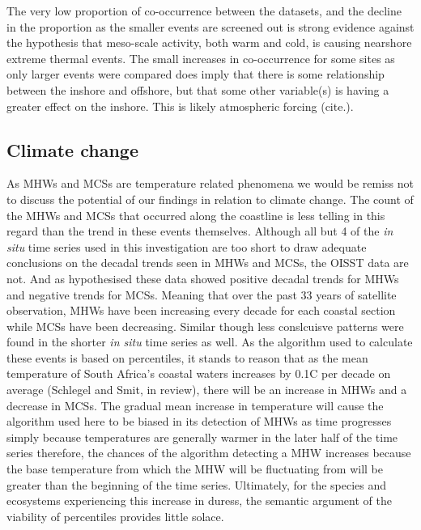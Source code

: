 \documentclass[a4paper,10pt,review]{elsarticle}
\begin{document}
The very low proportion of co-occurrence between the datasets, and the decline in the proportion as the smaller events are screened out is strong evidence against the hypothesis that meso-scale activity, both warm and cold, is causing nearshore extreme thermal events. The small increases in co-occurrence for some sites as only larger events were compared does imply that there is some relationship between the inshore and offshore, but that some other variable(s) is having a greater effect on the inshore. This is likely atmospheric forcing (cite.).

\subsection{Climate change}
As MHWs and MCSs are temperature related phenomena we would be remiss not to discuss the potential of our findings in relation to climate change. The count of the MHWs and MCSs that occurred along the coastline is less telling in this regard than the trend in these events themselves. Although all but 4 of the \emph{in situ} time series used in this investigation are too short to draw adequate conclusions on the decadal trends seen in MHWs and MCSs, the OISST data are not. And as hypothesised these data showed positive decadal trends for MHWs and negative trends for MCSs. Meaning that over the past 33 years of satellite observation, MHWs have been increasing every decade for each coastal section while MCSs have been decreasing. Similar though less conslcuisve patterns were found in the shorter \emph{in situ} time series as well. As the algorithm used to calculate these events is based on percentiles, it stands to reason that as the mean temperature of South Africa's coastal waters increases by 0.1\degree C per decade on average (Schlegel and Smit, in review), there will be an increase in MHWs and a decrease in MCSs. The gradual mean increase in temperature will cause the algorithm used here to be biased in its detection of MHWs as time progresses simply because temperatures are generally warmer in the later half of the time series therefore, the chances of the algorithm detecting a MHW increases because the base temperature from which the MHW will be fluctuating from will be greater than the beginning of the time series. Ultimately, for the species and ecosystems experiencing this increase in duress, the semantic argument of the viability of percentiles provides little solace. 
\end{document}
